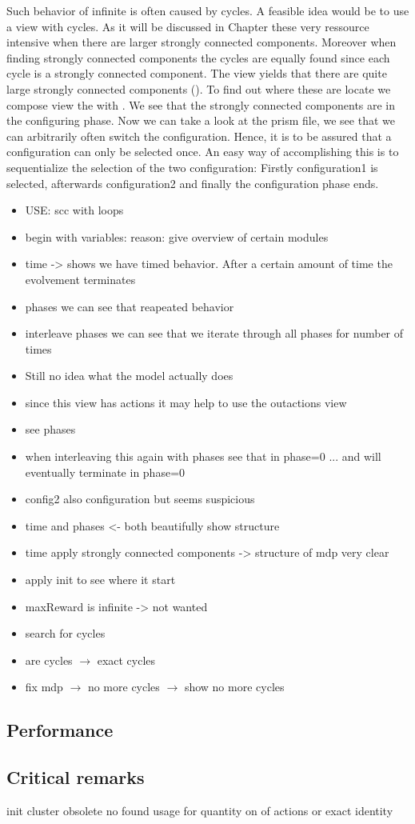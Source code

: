 \documentclass[preview]{standalone}
\begin{document}
Such behavior of infinite  is often caused by cycles. A feasible idea would be to use a view with cycles. As it will be discussed in Chapter  these \viewsN very ressource intensive when there are larger strongly connected components. Moreover when finding strongly connected components the cycles are equally found since each cycle is a strongly connected component. The view yields that there are quite large strongly connected components (). To find out where these are locate we compose view the \mdpN with \viewscc \pll \viewstrongoutactident. We see that the strongly connected components are in the configuring phase. Now we can take a look at the prism file, we see that we can arbitrarily often switch the configuration. Hence, it is to be assured that a configuration can only be selected once. An easy way of accomplishing this is to sequentialize the selection of the two configuration: Firstly configuration1 is selected, afterwards configuration2 and finally the configuration phase ends.


\begin{itemize}
	\item USE: scc with loops
	\item begin with variables: reason: give overview of certain modules
	\item time -> shows we have timed behavior. After a certain amount of time the evolvement terminates
	\item phases we can see that reapeated behavior
	\item interleave phases we can see that we iterate through all phases for number of times
	\item Still no idea what the model actually does
	\item since this view has actions it may help to use the outactions view
	\item see phases
	\item when interleaving this again with phases see that in phase=0 ... and will eventually terminate in phase=0
	\item config2 also configuration but seems suspicious
	\item time and phases <- both beautifully show structure
	\item time apply strongly connected components -> structure of mdp very clear
	\item apply init to see where it start
	\item maxReward is infinite -> not wanted
	\item search for cycles
	\item are cycles $\to$ exact cycles 
	\item fix mdp $\to$ no more cycles $\to$ show no more cycles
	
\end{itemize}

\subsection{Performance}

\subsection{Critical remarks}
init cluster obsolete
no found usage for quantity on of actions or exact identity
\end{document}
